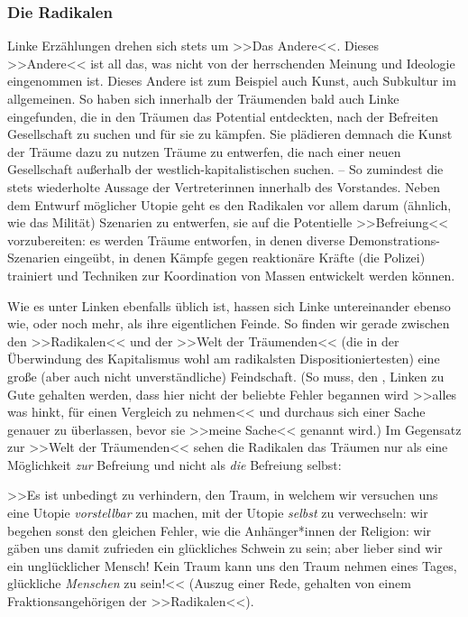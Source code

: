 \documentclass[12pt, a4paper, openany]{report}
\begin{document}
\subsubsection{Die Radikalen}
Linke Erzählungen drehen sich stets um >>Das Andere<<.
Dieses >>Andere<< ist all das, was nicht von der herrschenden Meinung und Ideologie eingenommen ist.
Dieses Andere ist zum Beispiel auch Kunst, auch Subkultur im allgemeinen. 
So haben sich innerhalb der Träumenden bald auch Linke eingefunden, die in den Träumen das Potential entdeckten, nach der Befreiten Gesellschaft zu suchen und für sie zu kämpfen.
Sie plädieren demnach die Kunst der Träume dazu zu nutzen Träume zu entwerfen, die nach einer neuen Gesellschaft außerhalb der westlich-kapitalistischen suchen.
-- So zumindest die stets wiederholte Aussage der Vertreterinnen innerhalb des Vorstandes. 
Neben dem Entwurf möglicher Utopie geht es den Radikalen vor allem darum (ähnlich, wie das Milität) Szenarien zu entwerfen, sie auf die Potentielle >>Befreiung<< vorzubereiten:
es werden Träume entworfen, in denen diverse Demonstrations-Szenarien eingeübt, in denen Kämpfe gegen reaktionäre Kräfte (die Polizei) trainiert und Techniken zur Koordination von Massen entwickelt werden können. 

Wie es unter Linken ebenfalls üblich ist, hassen sich Linke untereinander ebenso wie, oder noch mehr, als ihre eigentlichen Feinde.
So finden wir gerade zwischen den >>Radikalen<< und der >>Welt der Träumenden<< (die in der Überwindung des Kapitalismus wohl am radikalsten Dispositioniertesten) eine große (aber auch nicht unverständliche) Feindschaft. 
(So muss, den , Linken zu Gute gehalten werden, dass hier nicht der beliebte Fehler begannen wird >>alles was hinkt, für einen Vergleich zu nehmen<< und durchaus sich einer Sache genauer zu überlassen, bevor sie >>meine Sache<< genannt wird.)
Im Gegensatz zur >>Welt der Träumenden<< sehen die Radikalen das Träumen nur als eine Möglichkeit \emph{zur} Befreiung und nicht als \emph{die} Befreiung selbst:

>>Es ist unbedingt zu verhindern, den Traum, in welchem wir versuchen uns eine Utopie \emph{vorstellbar} zu machen, mit der Utopie \emph{selbst} zu verwechseln:
wir begehen sonst den gleichen Fehler, wie die Anhänger*innen der Religion: wir gäben uns damit zufrieden ein glückliches Schwein zu sein;
aber lieber sind wir ein unglücklicher Mensch!
Kein Traum kann uns den Traum nehmen eines Tages, glückliche \emph{Menschen} zu sein!<< (Auszug einer Rede, gehalten von einem Fraktionsangehörigen der >>Radikalen<<).
\end{document}
